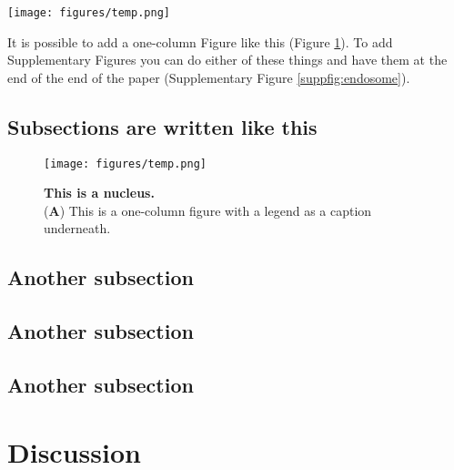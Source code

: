 \documentclass[submit]{theme/bioRxiv}
\begin{document}
\begin{figure*}
\centering
\texttt{[image: figures/temp.png]}
\caption{\textbf{These are cells.}\\
(\textbf{A}) This is a regular figure with a legend as a caption underneath. Inset: 3X zoom. Scale bar, \SI{10}{\micro\meter}.}
\label{fig:cells}
\end{figure*}

It is possible to add a one-column Figure like this (Figure \ref{fig:nucleus}).
To add Supplementary Figures you can do either of these things and have them at the end of the end of the paper (Supplementary Figure \ref{suppfig:endosome}).

\lipsum[10]

\subsection*{Subsections are written like this}

\lipsum[11]

\begin{figure}
\centering
\texttt{[image: figures/temp.png]}
\caption{\textbf{This is a nucleus.}\\
(\textbf{A}) This is a one-column figure with a legend as a caption underneath.}
\label{fig:nucleus}
\end{figure}

\lipsum[12]

\subsection*{Another subsection}

\lipsum[13-14]

\subsection*{Another subsection}

\lipsum[13-14]

\subsection*{Another subsection}

\lipsum[13-14]

\section*{Discussion}\label{s:discussion}
\end{document}
